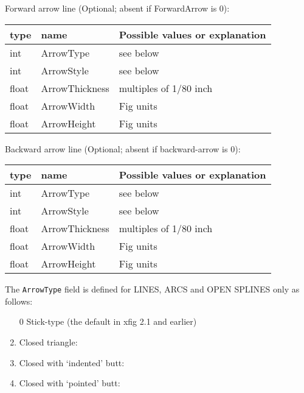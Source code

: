 \documentclass[10pt, a4paper]{article}%
\begin{document}
Forward arrow line (Optional; absent if ForwardArrow is 0): \\
%
\begin{tabular}{lll}
\toprule
type & name & Possible values or explanation \\
\midrule
\midrule
int    & ArrowType      & see below \\
int    & ArrowStyle     & see below \\
float  & ArrowThickness & multiples of 1/80 inch \\
float  & ArrowWidth     & Fig units \\
float  & ArrowHeight    & Fig units \\
\bottomrule
\end{tabular}

Backward arrow line (Optional; absent if backward-arrow is 0): \\
%
\begin{tabular}{lll}
\toprule
type & name & Possible values or explanation \\
\midrule
\midrule
int    & ArrowType      & see below \\
int    & ArrowStyle     & see below \\
float  & ArrowThickness & multiples of 1/80 inch \\
float  & ArrowWidth     & Fig units \\
float  & ArrowHeight    & Fig units \\
\bottomrule
\end{tabular}

The \texttt{ArrowType} field is defined for LINES, ARCS and OPEN SPLINES only as follows:
%
\begin{enumerate}
\item[0] Stick-type (the default in xfig 2.1 and earlier)
\item    Closed triangle:
 \item   Closed with `indented' butt:
\item    Closed with `pointed' butt:
\end{enumerate}
\end{document}
